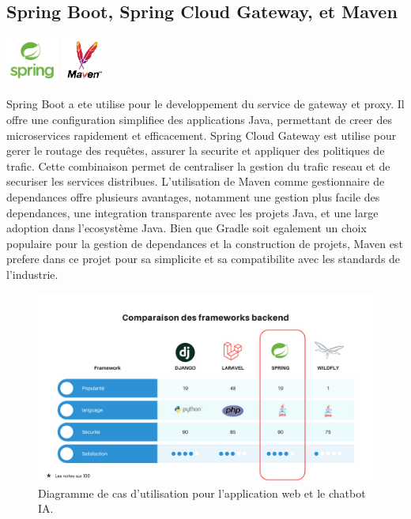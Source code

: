 \documentclass[a4paper, 11pt, openany]{report}
\begin{document}
\subsection{Spring Boot, Spring Cloud Gateway, et Maven}
\begin{center}
\includegraphics[height=1.5cm]{images/spring.png}
\includegraphics[height=1.5cm]{maven.png}
\end{center}

Spring Boot a ete utilise pour le developpement du service de gateway et proxy. Il offre une configuration simplifiee des applications Java, permettant de creer des microservices rapidement et efficacement. Spring Cloud Gateway est utilise pour gerer le routage des requêtes, assurer la securite et appliquer des politiques de trafic. Cette combinaison permet de centraliser la gestion du trafic reseau et de securiser les services distribues. L'utilisation de Maven comme gestionnaire de dependances offre plusieurs avantages, notamment une gestion plus facile des dependances, une integration transparente avec les projets Java, et une large adoption dans l'ecosystème Java. Bien que Gradle soit egalement un choix populaire pour la gestion de dependances et la construction de projets, Maven est prefere dans ce projet pour sa simplicite et sa compatibilite avec les standards de l'industrie.



\begin{figure}[h!]
\centering
\includegraphics[width=\textwidth]{images/bechmark.png}
\caption{Diagramme de cas d'utilisation pour l'application web et le chatbot IA.}
\label{fig:bechmark}
\end{figure}
\end{document}
